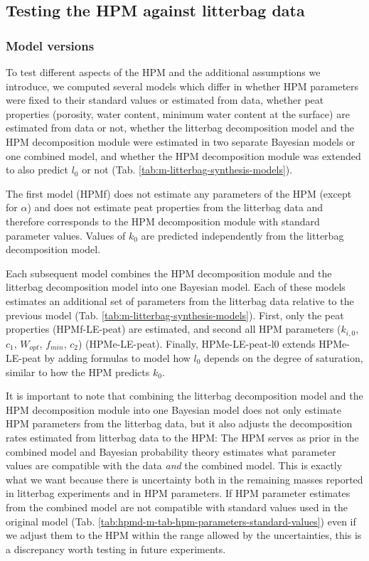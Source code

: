 \documentclass[esd, manuscript]{copernicus}
\begin{document}
\hypertarget{sdm-003-methods-7}{%
\subsection{Testing the HPM against litterbag data}\label{sdm-003-methods-7}}

\hypertarget{sdm-003-methods-8}{%
\subsubsection{Model versions}\label{sdm-003-methods-8}}

To test different aspects of the HPM and the additional assumptions we introduce, we computed several models which differ in whether HPM parameters were fixed to their standard values or estimated from data, whether peat properties (porosity, water content, minimum water content at the surface) are estimated from data or not, whether the litterbag decomposition model and the HPM decomposition module were estimated in two separate Bayesian models or one combined model, and whether the HPM decomposition module was extended to also predict \(l_0\) or not (Tab. \ref{tab:m-litterbag-synthesis-models}).

The first model (HPMf) does not estimate any parameters of the HPM (except for \(\alpha\)) and does not estimate peat properties from the litterbag data and therefore corresponds to the HPM decomposition module with standard parameter values. Values of \(k_0\) are predicted independently from the litterbag decomposition model.

Each subsequent model combines the HPM decomposition module and the litterbag decomposition model into one Bayesian model. Each of these models estimates an additional set of parameters from the litterbag data relative to the previous model (Tab. \ref{tab:m-litterbag-synthesis-models}). First, only the peat properties (HPMf-LE-peat) are estimated, and second all HPM parameters (\(k_{i,0}\), \(c_1\), \(W_{opt}\), \(f_{min}\), \(c_2\)) (HPMe-LE-peat). Finally, HPMe-LE-peat-l0 extends HPMe-LE-peat by adding formulas to model how \(l_0\) depends on the degree of saturation, similar to how the HPM predicts \(k_0\).

It is important to note that combining the litterbag decomposition model and the HPM decomposition module into one Bayesian model does not only estimate HPM parameters from the litterbag data, but it also adjusts the decomposition rates estimated from litterbag data to the HPM: The HPM serves as prior in the combined model and Bayesian probability theory estimates what parameter values are compatible with the data \emph{and} the combined model. This is exactly what we want because there is uncertainty both in the remaining masses reported in litterbag experiments and in HPM parameters. If HPM parameter estimates from the combined model are not compatible with standard values used in the original model (Tab. \ref{tab:hpmd-m-tab-hpm-parameters-standard-values}) even if we adjust them to the HPM within the range allowed by the uncertainties, this is a discrepancy worth testing in future experiments.
\end{document}
